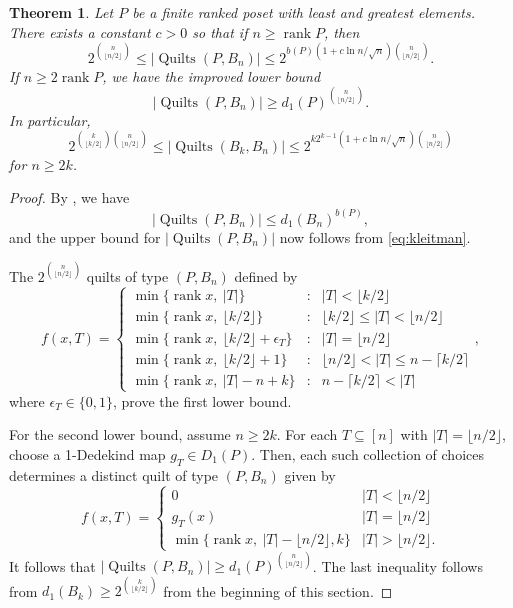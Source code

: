 \documentclass[12pt]{amsart}
\numberwithin{equation}{section}
\newtheorem{theorem}{Theorem}[section]
\theoremstyle{definition}
\newcommand{\floor}[1]{\lfloor {#1} \rfloor}
\newcommand{\ceiling}[1]{\lceil {#1} \rceil}
\newcommand{\quilt}{\operatorname{Quilts}}
\newcommand{\rank}{\operatorname{rank}}
\begin{document}
\begin{theorem}\label{thm:bounds}
Let $P$ be a finite ranked poset with least and greatest
elements. There exists a constant $c>0$ so that if $n \geq \rank P$, then
$$2^{\binom n{\floor{n/2}}} \leq |\quilt(P,B_n)| \leq
2^{b(P) (1+c \ln n/\sqrt n)\binom n{\floor{n/2}}}.$$  If $n \geq 2
\rank P$, we have the improved lower bound $$|\quilt(P,B_n)| \geq d_1(P)^{\binom
n{\floor{n/2}}}.
$$
In particular, $$ 2^{\binom
k{\floor{k/2}} \binom n{\floor{n/2}}}\leq |\quilt(B_k,B_n)| \leq
2^{k2^{k-1} (1+c \ln n/\sqrt n)\binom n{\floor{n/2}}} $$
for $n \geq 2k$.
\end{theorem}
\begin{proof}
By , we have
$$|\quilt(P,B_n)| \leq d_1(B_n)^{b(P)},$$
and the upper bound for $|\quilt(P,B_n)|$ now follows from \eqref{eq:kleitman}.

The $2^{\binom n{\floor{n/2}}}$ quilts of type $(P, B_{n})$ defined by
$$f(x, T) =
\left\{ \begin{array}{ccl}
 \min\{\rank x,\ |T|\} & : & |T| < \floor{k/2} \\
 \min\{\rank x,\ \floor{k/2}\} & : & \floor{k/2} \leq |T| < \floor{n/2} \\
 \min\{\rank x,\ \floor{k/2}+\epsilon_T\} & : & |T| = \floor{n/2} \\
 \min\{\rank x,\ \floor{k/2}+1\} & : & \floor{n/2} < |T| \leq n - \ceiling{k/2}  \\
 \min\{\rank x,\ |T|-n+k\} & : & n - \ceiling{k/2} <  |T|
\end{array} \right., $$
where $\epsilon_T \in \{0,1\}$, prove the first lower bound.

For the second lower bound, assume $n \geq 2k$.
For each $T \subseteq [n]$ with $|T| = \floor{n/2}$, choose a
1-Dedekind map $g_T \in D_1(P)$. Then, each such collection of choices
determines a distinct quilt of type $(P,B_n)$ given by
\[
f(x,T) = \begin{cases}
0 &  |T| < \floor{n/2} \\
g_T(x) &  |T| = \floor{n/2} \\
\min\{\rank x,\ |T|-\floor{n/2},k\} &  |T| > \floor{n/2}.
\end{cases}
\]
It follows that $|\quilt(P,B_n)| \geq d_1(P)^{\binom
 n{\floor{n/2}}}$. The last inequality follows from $d_1(B_k) \geq
 2^{\binom k{\floor{k/2}}}$ from the beginning of this section.
\end{proof}
\end{document}
